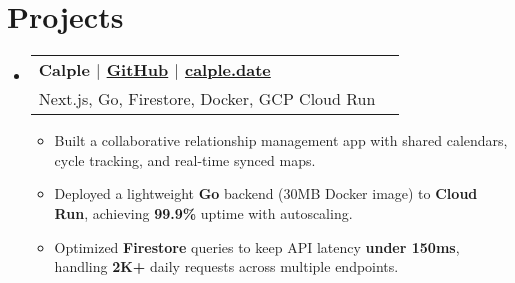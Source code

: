 \documentclass[letterpaper,11pt]{article}
\makeatletter
\newcommand{\resumeItem}[1]{
  \item{
    {#1}
  }
}
\newcommand{\resumeSubheading}[4]{
    \item
    \begin{tabular*}{0.985\textwidth}[t]{l@{\extracolsep{\fill}}r@{\hspace{-0.1in}}}
        {\textbf{#1}} & {#2} \\
        #3 &  #4 \\
    \end{tabular*}\vspace{-5pt}
}
\newcommand{\resumeSubHeadingListStart}{\begin{itemize}[leftmargin=0.00in, rightmargin=-0.2in, label={}]\vspace{3pt}}
\newcommand{\resumeSubHeadingListEnd}{\end{itemize}\vspace{-5pt}}
\newcommand{\resumeItemListStart}{\vspace{3pt}\begin{itemize}[leftmargin=0.15in, rightmargin=0.15in]}
\newcommand{\resumeItemListEnd}{\end{itemize}\vspace{-5pt}}
\makeatother
\begin{document}

\section{Projects}


\resumeSubHeadingListStart
\resumeSubheading
{\textbf{Calple} \textnormal{$|$ \href{https://github.com/juhun32/calple}{GitHub} $|$ \href{https://www.calple.date}{calple.date}}} {}
{{Next.js, Go, Firestore, Docker, GCP Cloud Run}}{}
\resumeItemListStart
\resumeItem{Built a collaborative relationship management app with shared calendars, cycle tracking, and real-time synced maps.}
\resumeItem{Deployed a lightweight \textbf{Go} backend (30MB Docker image) to \textbf{Cloud Run}, achieving \textbf{99.9\%} uptime with autoscaling.}
\resumeItem{Optimized \textbf{Firestore} queries to keep API latency \textbf{under 150ms}, handling \textbf{2K+} daily requests across multiple endpoints.}
\resumeItemListEnd
\resumeSubHeadingListEnd

\end{document}

